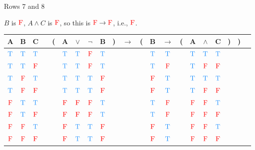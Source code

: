 \documentclass[
  ignorenonframetext,
]{beamer}
\renewcommand{\,}{\text{, }}
\def\True{\textcolor{dodgerblue}{\text{T}}}
\def\False{\textcolor{red}{\text{F}}}
\begin{document}
\begin{frame}{Rows 7 and 8}
\protect\hypertarget{rows-7-and-8}{}

\(B\) is \(\False\), \(A \wedge C\) is \(\False\), so this is
\(\False \rightarrow \False\), i.e., \(\False\).

\begin{center}
\bigskip
\begin{tabular}{@{ }c@{ }@{ }c@{ }@{ }c | c@{ }@{}c@{}@{ }c@{ }@{ }c@{ }@{ }c@{ }@{ }c@{ }@{}c@{}@{ }c@{ }@{}c@{}@{ }c@{ }@{ }c@{ }@{}c@{}@{ }c@{ }@{ }c@{ }@{ }c@{ }@{}c@{}@{}c@{}@{ }c}
A & B & C &  & ( & A & $\vee$ & $\neg$ & B & ) & $\rightarrow$ & ( & B & $\rightarrow$ & ( & A & $\wedge$ & C & ) & ) & \\
\hline 
 $\True$ & $\True$ & $\True$ &  &  & $\True$ & $\True$ & $\False$ & $\True$ &  &&  & $\True$ & $\True$ &  & $\True$ & $\True$ & $\True$ &  &  & \\
 $\True$ & $\True$ & $\False$ &  &  & $\True$ & $\True$ & $\False$ & $\True$ &  &&  & $\True$ & $\False$ &  & $\True$ & $\False$ & $\False$ &  &  & \\
 $\True$ & $\False$ & $\True$ &  &  & $\True$ & $\True$ & $\True$ & $\False$ &  &&  & $\False$ & $\True$ &  & $\True$ & $\True$ & $\True$ &  &  & \\
 $\True$ & $\False$ & $\False$ &  &  & $\True$ & $\True$ & $\True$ & $\False$ &  &&  & $\False$ & $\True$ &  & $\True$ & $\False$ & $\False$ &  &  & \\
 $\False$ & $\True$ & $\True$ &  &  & $\False$ & $\False$ & $\False$ & $\True$ &  &&  & $\True$ & $\False$ &  & $\False$ & $\False$ & $\True$ &  &  & \\
 $\False$ & $\True$ & $\False$ &  &  & $\False$ & $\False$ & $\False$ & $\True$ &  &&  & $\True$ & $\False$ &  & $\False$ & $\False$ & $\False$ &  &  & \\
 $\False$ & $\False$ & $\True$ &  &  & $\False$ & $\True$ & $\True$ & $\False$ &  &&  & $\False$ & $\True$ &  & $\False$ & $\False$ & $\True$ &  &  & \\
 $\False$ & $\False$ & $\False$ &  &  & $\False$ & $\True$ & $\True$ & $\False$ &  &&  & $\False$ & $\True$ &  & $\False$ & $\False$ & $\False$ &  &  & \\
\end{tabular}
\bigskip
\end{center}

\end{frame}
\end{document}

